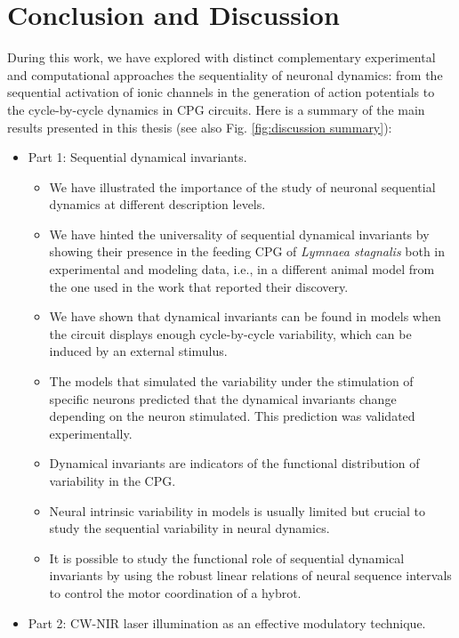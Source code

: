 \chapter{Conclusion and Discussion} %
\label{c-conclusion}

During this work, we have explored with distinct complementary experimental and computational approaches the sequentiality of neuronal dynamics: from the sequential activation of ionic channels in the generation of action potentials to the cycle-by-cycle dynamics in CPG circuits. Here is a summary of the main results presented in this thesis (see also Fig. \ref{fig:discussion summary}):

\begin{itemize}
	\item Part 1: Sequential dynamical invariants.
 \begin{itemize}
     \item We have illustrated the importance of the study of neuronal sequential dynamics at different description levels.
     \item We have hinted the universality of sequential dynamical invariants by showing their  presence in the feeding CPG of  \textit{Lymnaea stagnalis} both in experimental and modeling data, i.e., in a different animal model from the one used in the work that reported their discovery.
     \item We have shown that dynamical invariants can be found in models when the circuit displays enough cycle-by-cycle variability, which can be induced by an external stimulus.
     \item The models that simulated the variability under the stimulation of specific neurons predicted that the dynamical invariants change depending on the neuron stimulated. This prediction was validated experimentally.
     \item Dynamical invariants are indicators of the functional distribution of  variability  in the CPG.
     \item Neural intrinsic variability in models is usually limited but crucial to study the sequential variability in neural dynamics.
     \item It is possible to study the functional role of sequential dynamical invariants by using  the robust linear relations of neural sequence intervals to control the motor coordination of a hybrot.
 \end{itemize}
	\item Part 2: CW-NIR laser illumination as an effective modulatory technique.

\end{itemize}
